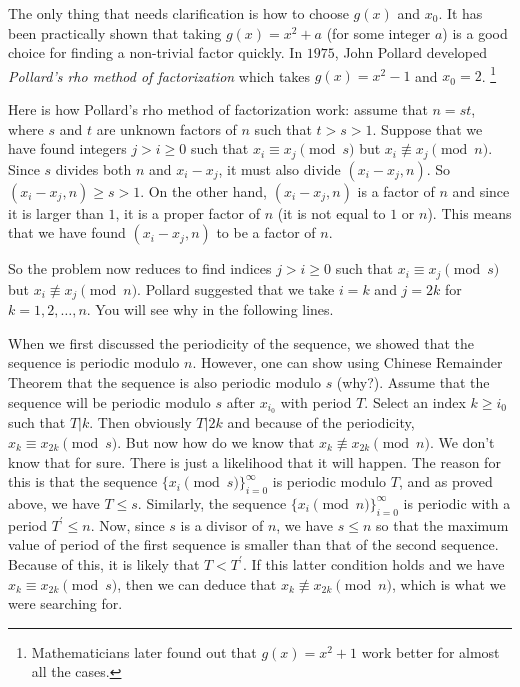 \documentclass{subfiles}
\begin{document}
	The only thing that needs clarification is how to choose $g(x)$ and $x_0$. It has been practically shown that taking $g(x)=x^2+a$ (for some integer $a$) is a good choice for finding a non-trivial factor quickly. 
	In $1975$, John Pollard developed \emph{Pollard's rho method of factorization} which takes $g(x)=x^2-1$ and $x_0=2$. \footnote{Mathematicians later found out that $g(x)=x^2+1$ work better for almost all the cases.}
	
	Here is how Pollard's rho method of factorization work: assume that $n=st$, where $s$ and $t$ are unknown factors of $n$ such that $t>s>1$. Suppose that we have found integers $j>i\geq 0$ such that $x_i \equiv x_j \pmod s$ but $x_i \not \equiv x_j \pmod n$. Since $s$ divides both $n$ and $x_i-x_j$, it must also divide $(x_i-x_j, n)$. So $(x_i-x_j, n) \geq s >1$. On the other hand, $(x_i-x_j, n)$ is a factor of $n$ and since it is larger than $1$, it is a proper factor of $n$ (it is not equal to $1$ or $n$). This means that we have found $(x_i-x_j, n)$ to be a factor of $n$.
	
	So the problem now reduces to find indices $j>i \geq 0$ such that $x_i \equiv x_j \pmod s$ but $x_i \not \equiv x_j \pmod n$. Pollard suggested that we take $i=k$ and $j=2k$ for $k=1,2,\ldots, n$. You will see why in the following lines. 
	
	When we first discussed the periodicity of the sequence, we showed that the sequence is periodic modulo $n$. However, one can show using Chinese Remainder Theorem that the sequence is also periodic modulo $s$ (why?). Assume that the sequence will be periodic modulo $s$ after $x_{i_0}$ with period $T$. Select an index $k \geq i_0$ such that $T|k$. Then obviously $T|2k$ and because of the periodicity, $x_{k} \equiv x_{2k} \pmod s$. But now how do we know that $x_{k} \not \equiv x_{2k} \pmod n$. We don't know that for sure. There is just a likelihood that it will happen. The reason for this is that the sequence $\{x_i \pmod s\}_{i=0}^{\infty}$ is periodic modulo $T$, and as proved above, we have $T \leq s$. Similarly, the sequence $\{x_i \pmod n\}_{i=0}^{\infty}$ is periodic with a period $T^{\prime} \leq n$. Now, since $s$ is a divisor of $n$, we have $s \leq n$ so that the maximum value of period of the first sequence is smaller than that of the second sequence. Because of this, it is likely that $T<T^{\prime}$. If this latter condition holds and we have $x_{k}\equiv x_{2k} \pmod s$, then we can deduce that $x_k \not \equiv x_{2k} \pmod n$, which is what we were searching for.
	
\end{document}
